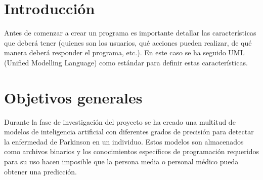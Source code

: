\newcommand{\cu}[9]{
    \begin{table}[p]
        \centering
        \begin{tabularx}{\linewidth}{ p{0.21\columnwidth} p{0.71\columnwidth} }
            \toprule
            \textbf{CU-#1}      & \textbf{#2} \\
            \toprule
            \textbf{Versión}              & 1.0          \\
            \textbf{Autor}                & \theauthor  \\
            \textbf{Requisitos asociados} & #3          \\
            \textbf{Descripción}          & #4          \\
            \textbf{Precondición}         & #5          \\
            \textbf{Acciones}             & #6          \\
            \textbf{Postcondición}        & #7          \\
            \textbf{Excepciones}          & #8          \\
            \textbf{Importancia}          & #9          \\
            \bottomrule
        \end{tabularx}
        \caption{CU-#1 #2.}
    \end{table}
}


\label{cha:Especificación de Requisitos}

\section{Introducción}

Antes de comenzar a crear un programa es importante detallar las características
que deberá tener (quienes son los usuarios, qué acciones pueden realizar, de qué
manera deberá responder el programa, etc.). En este caso se ha seguido UML
(Unified Modelling Language) como estándar para definir estas características.

\section{Objetivos generales}

Durante la fase de investigación del proyecto se ha creado una multitud de
modelos de inteligencia artificial con diferentes grados de precisión para
detectar la enfermedad de Parkinson en un individuo. Estos modelos son
almacenados como archivos binarios y los conocimientos específicos de
programación requeridos para su uso hacen imposible que la persona media o
personal médico pueda obtener una predicción.

